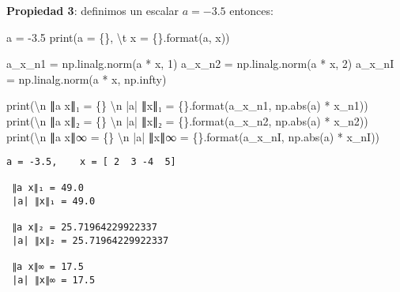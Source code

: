 \documentclass[
  letterpaper,
  DIV=11,
  numbers=noendperiod]{scrreprt}
\newenvironment{Shaded}{\begin{snugshade}}{\end{snugshade}}
\newcommand{\BuiltInTok}[1]{\textcolor[rgb]{0.00,0.23,0.31}{#1}}
\newcommand{\CharTok}[1]{\textcolor[rgb]{0.13,0.47,0.30}{#1}}
\newcommand{\DecValTok}[1]{\textcolor[rgb]{0.68,0.00,0.00}{#1}}
\newcommand{\FloatTok}[1]{\textcolor[rgb]{0.68,0.00,0.00}{#1}}
\newcommand{\NormalTok}[1]{\textcolor[rgb]{0.00,0.23,0.31}{#1}}
\newcommand{\OperatorTok}[1]{\textcolor[rgb]{0.37,0.37,0.37}{#1}}
\newcommand{\SpecialCharTok}[1]{\textcolor[rgb]{0.37,0.37,0.37}{#1}}
\newcommand{\StringTok}[1]{\textcolor[rgb]{0.13,0.47,0.30}{#1}}
\begin{document}
\textbf{Propiedad 3}: definimos un escalar \(a = -3.5\) entonces:

\begin{Shaded}
\begin{Highlighting}[]
\NormalTok{a }\OperatorTok{=} \OperatorTok{{-}}\FloatTok{3.5}
\BuiltInTok{print}\NormalTok{(}\StringTok{\textquotesingle{}a = }\SpecialCharTok{\{\}}\StringTok{, }\CharTok{\textbackslash{}t}\StringTok{ x = }\SpecialCharTok{\{\}}\StringTok{\textquotesingle{}}\NormalTok{.}\BuiltInTok{format}\NormalTok{(a, x))}
      
\NormalTok{a\_x\_n1 }\OperatorTok{=}\NormalTok{ np.linalg.norm(a }\OperatorTok{*}\NormalTok{ x, }\DecValTok{1}\NormalTok{) }
\NormalTok{a\_x\_n2 }\OperatorTok{=}\NormalTok{ np.linalg.norm(a }\OperatorTok{*}\NormalTok{ x, }\DecValTok{2}\NormalTok{) }
\NormalTok{a\_x\_nI }\OperatorTok{=}\NormalTok{ np.linalg.norm(a }\OperatorTok{*}\NormalTok{ x, np.infty) }

\BuiltInTok{print}\NormalTok{(}\StringTok{\textquotesingle{}}\CharTok{\textbackslash{}n}\StringTok{ ∥a x∥₁ = }\SpecialCharTok{\{\}}\StringTok{ }\CharTok{\textbackslash{}n}\StringTok{ |a| ∥x∥₁ = }\SpecialCharTok{\{\}}\StringTok{\textquotesingle{}}\NormalTok{.}\BuiltInTok{format}\NormalTok{(a\_x\_n1, np.}\BuiltInTok{abs}\NormalTok{(a) }\OperatorTok{*}\NormalTok{ x\_n1))}
\BuiltInTok{print}\NormalTok{(}\StringTok{\textquotesingle{}}\CharTok{\textbackslash{}n}\StringTok{ ∥a x∥₂ = }\SpecialCharTok{\{\}}\StringTok{ }\CharTok{\textbackslash{}n}\StringTok{ |a| ∥x∥₂ = }\SpecialCharTok{\{\}}\StringTok{\textquotesingle{}}\NormalTok{.}\BuiltInTok{format}\NormalTok{(a\_x\_n2, np.}\BuiltInTok{abs}\NormalTok{(a) }\OperatorTok{*}\NormalTok{ x\_n2))}
\BuiltInTok{print}\NormalTok{(}\StringTok{\textquotesingle{}}\CharTok{\textbackslash{}n}\StringTok{ ∥a x∥∞ = }\SpecialCharTok{\{\}}\StringTok{ }\CharTok{\textbackslash{}n}\StringTok{ |a| ∥x∥∞ = }\SpecialCharTok{\{\}}\StringTok{\textquotesingle{}}\NormalTok{.}\BuiltInTok{format}\NormalTok{(a\_x\_nI, np.}\BuiltInTok{abs}\NormalTok{(a) }\OperatorTok{*}\NormalTok{ x\_nI))}
\end{Highlighting}
\end{Shaded}

\begin{verbatim}
a = -3.5,    x = [ 2  3 -4  5]

 ∥a x∥₁ = 49.0 
 |a| ∥x∥₁ = 49.0

 ∥a x∥₂ = 25.71964229922337 
 |a| ∥x∥₂ = 25.71964229922337

 ∥a x∥∞ = 17.5 
 |a| ∥x∥∞ = 17.5
\end{verbatim}
\end{document}
